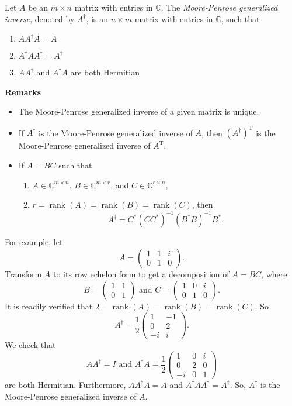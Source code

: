 \documentclass[12pt]{article}
\begin{document}
Let $A$ be an $m\times n$ matrix with entries in $\mathbb{C}$. The \emph{Moore-Penrose generalized inverse}, denoted by $A^{\dagger}$, is an $n\times m$ matrix with entries in $\mathbb{C}$, such that
\begin{enumerate}
\item $AA^{\dagger}A=A$
\item $A^{\dagger}AA^{\dagger}=A^{\dagger}$
\item $AA^{\dagger}$ and $A^{\dagger}A$ are both Hermitian
\end{enumerate}

\textbf{Remarks}
\begin{itemize}
\item The Moore-Penrose generalized inverse of a given matrix is unique.
\item If $A^{\dagger}$ is the Moore-Penrose generalized inverse of $A$, then $(A^{\dagger})^{\operatorname{T}}$ is the Moore-Penrose generalized inverse of $A^{\operatorname{T}}$.
\item If $A=BC$ such that
\begin{enumerate}
\item $A\in\mathbb{C}^{m\times n}$, $B\in\mathbb{C}^{m\times r}$, and $C\in\mathbb{C}^{r\times n}$,
\item $r=\operatorname{rank}(A)=\operatorname{rank}(B)=\operatorname{rank}(C)$, then $$A^{\dagger}=C^{\ast}(CC^{\ast})^{-1}(B^{\ast}B)^{-1}B^{\ast}.$$
\end{enumerate}
\end{itemize}

For example, let
$$A=\begin{pmatrix} 1&1&i \\ 0&1&0 \end{pmatrix}.$$
Transform $A$ to its row echelon form to get a decomposition of $A=BC$, where $$B=\begin{pmatrix} 1&1 \\ 0&1 \end{pmatrix}\mbox{ and }C=\begin{pmatrix} 1&0&i \\ 0&1&0 \end{pmatrix}.$$
It is readily verified that $2=\operatorname{rank}(A)=\operatorname{rank}(B)=\operatorname{rank}(C)$.  
So $$A^{\dagger}=\frac{1}{2}\begin{pmatrix} 1&-1 \\ 0&2 \\ -i&i \end{pmatrix}.$$
We check that $$AA^{\dagger}=I\mbox{ and }A^{\dagger}A=\frac{1}{2}\begin{pmatrix} 1&0&i \\ 0&2&0 \\ -i&0&1 \end{pmatrix}$$ are both Hermitian.  Furthermore, $AA^{\dagger}A=A$ and $A^{\dagger}AA^{\dagger}=A^{\dagger}$.  So, $A^{\dagger}$ is the Moore-Penrose generalized inverse of $A$.
\end{document}
